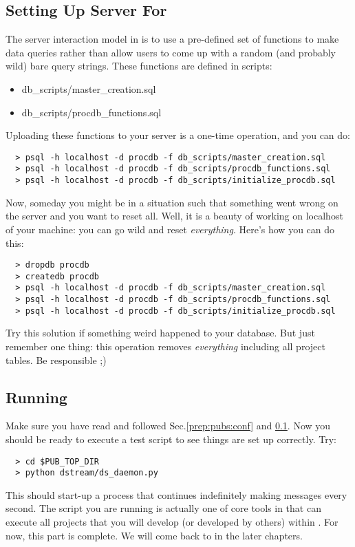 \subsection{Setting Up {\psql} Server For {\pubs}}
\label{prep:pubs:sql}
The {\psql} server interaction model in {\pubs} is to use a pre-defined set of functions 
to make data queries rather than allow users to come up with a random (and probably wild)
bare query strings. These functions are defined in {\sql} scripts:
\begin{itemize}
  \item db\_scripts/master\_creation.sql
  \item db\_scripts/procdb\_functions.sql
\end{itemize}
Uploading these functions to your server is a one-time operation, and you can do:
\begin{lstlisting}
  > psql -h localhost -d procdb -f db_scripts/master_creation.sql
  > psql -h localhost -d procdb -f db_scripts/procdb_functions.sql
  > psql -h localhost -d procdb -f db_scripts/initialize_procdb.sql
\end{lstlisting}

Now, someday you might be in a situation such that something went wrong on the server
and you want to reset all. Well, it is a beauty of working on localhost of your machine:
you can go wild and reset {\it everything}. Here's how you can do this:
\begin{lstlisting}
  > dropdb procdb
  > createdb procdb
  > psql -h localhost -d procdb -f db_scripts/master_creation.sql
  > psql -h localhost -d procdb -f db_scripts/procdb_functions.sql
  > psql -h localhost -d procdb -f db_scripts/initialize_procdb.sql
\end{lstlisting}

Try this solution if something weird happened to your {\procdb} database.
But just remember one thing: this operation removes {\it everything} including 
all project tables. Be responsible ;)

\subsection{Running {\pubs}}
Make sure you have read and followed Sec.\ref{prep:pubs:conf} and \ref{prep:pubs:sql}.
Now you should be ready to execute a test script to see things are set up correctly.
Try:
\begin{lstlisting}
  > cd $PUB_TOP_DIR
  > python dstream/ds_daemon.py
\end{lstlisting}
This should start-up a process that continues indefinitely making {\stdout} messages
every second. The script you are running is actually one of core tools in {\pubs} that
can execute all projects that you will develop (or developed by others) within {\pubs}.
For now, this part is complete. We will come back to in the later chapters.
